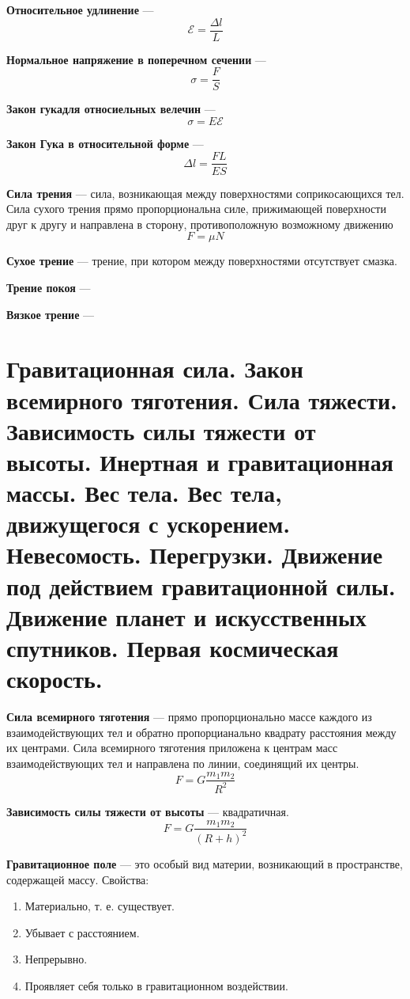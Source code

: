 \documentclass{report}
\begin{document}
{\bf Относительное удлинение} ---
$$
\mathcal{E}=\frac{\Delta l}{L}
$$

{\bf Нормальное напряжение в поперечном сечении} ---
$$
\sigma=\frac{F}{S}
$$

{\bf Закон гукадля относиельных велечин} ---
$$
\sigma =E\mathcal{E}
$$

{\bf Закон Гука в относительной форме} ---
$$
\Delta l=\frac{FL}{ES}
$$

{\bf Сила трения} ---
сила, возникающая между поверхностями соприкосающихся тел.
Сила сухого трения прямо пропорциональна силе, прижимающей 
поверхности друг к другу и направлена в сторону, противоположную возможному движению
$$
F=\mu N
$$

{\bf Сухое трение} ---
трение, при котором между поверхностями отсутствует смазка. 

{\bf Трение покоя} ---

{\bf Вязкое трение} ---



\part{Гравитационная сила. 
Закон всемирного тяготения. 
Сила тяжести. 
Зависимость силы тяжести от высоты. 
Инертная и гравитационная массы. 
Вес тела. 
Вес тела, движущегося с ускорением. 
Невесомость. 
Перегрузки. 
Движение под действием гравитационной силы. 
Движение планет и искусственных спутников. 
Первая космическая скорость. }

{\bf Сила всемирного тяготения} ---
прямо пропорционально массе каждого из взаимодействующих тел и обратно пропорцианально квадрату
расстояния между их центрами. Сила всемирного тяготения приложена к центрам масс взаимодействующих
тел и направлена по линии, соединящий их центры.
$$
F=G\frac{m_1m_2}{R^2}
$$ 

{\bf Зависимость силы тяжести от высоты} ---
квадратичная.
$$
F=G\frac{m_1m_2}{(R+h)^2}
$$

{\bf Гравитационное поле} ---
это особый вид материи, возникающий в пространстве, содержащей массу. Свойства:
\begin{enumerate}
  \item Материально, т. е. существует.
  \item Убывает с расстоянием.
  \item Непрерывно.
  \item Проявляет себя только в гравитационном воздействии.
\end{enumerate}
\end{document}
